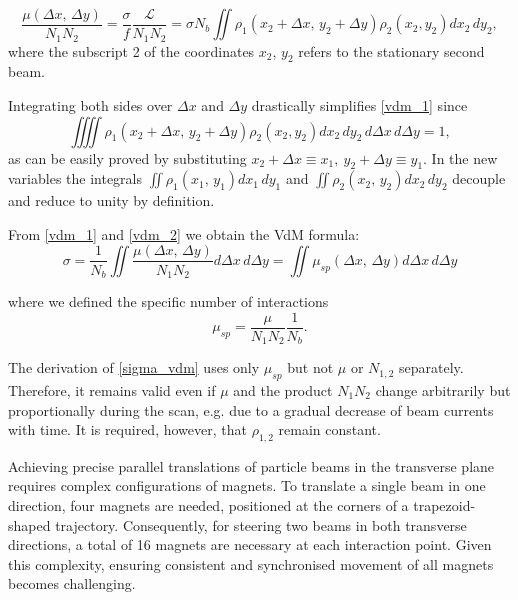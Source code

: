 \begin{equation}
\frac{\mu (\Delta x,\, \Delta y)}{N_1N_2} = \frac{\sigma}{f} \frac{\mathcal{L}}{N_1N_2} = \sigma N_b \iint \rho _1(x_2 + \Delta x,\, y_2 + \Delta y) \rho _2(x_2,y_2) dx_2\, dy_2, \label{vdm_1}
\end{equation}
where the subscript 2 of the coordinates $x_2$, $y_2$ refers to the stationary second beam.

Integrating both sides over $\Delta x$ and $\Delta y$ drastically simplifies \eqref{vdm_1} since
\begin{equation} \iiiint \rho _1(x_2 {+} \Delta x,\, y_2 {+} \Delta y) \rho _2(x_2,y_2) dx_2\, dy_2\, d\Delta x\, d\Delta y {=} 1, \label{vdm_2} \end{equation}
as can be easily proved by substituting $x_2+\Delta x\equiv x_1,\ y_2+\Delta y\equiv y_1$. In the new variables the integrals $\iint \rho _1(x_1,\, y_1)dx_1\,dy_1$ and $\iint \rho _2(x_2,\, y_2)dx_2\,dy_2$ decouple and reduce to unity by definition.

From \eqref{vdm_1} and \eqref{vdm_2} we obtain the VdM formula:
\begin{equation}
     \sigma = \frac{1}{N_b} \iint \frac{\mu (\Delta x,\, \Delta y)}{N_1N_2} d\Delta x\, d\Delta y= \iint \mu_{sp}(\Delta x,\, \Delta y)d\Delta x\, d \Delta y \label{sigma_vdm}
    \end{equation}

where we defined the specific number of interactions
\begin{equation}
\mu_{sp}=\frac{\mu}{N_1 N_2}\frac{1}{N_b}.\label{mu_sp}
\end{equation}

The derivation of \eqref{sigma_vdm} uses only $\mu _{sp}$ but not $\mu$ or $N_{1,2}$ separately. Therefore, it remains valid even if $\mu$ and the product $N_1N_2$ change arbitrarily but proportionally during the scan, e.g. due to a gradual decrease of beam currents with time. It is required, however, that $\rho_{1,2}$ remain constant.

Achieving precise parallel translations of particle beams in the transverse plane requires complex configurations of magnets. To translate a single beam in one direction, four magnets are needed, positioned at the corners of a trapezoid-shaped trajectory. Consequently, for steering two beams in both transverse directions, a total of 16 magnets are necessary at each interaction point. Given this complexity, ensuring consistent and synchronised movement of all magnets becomes challenging.


